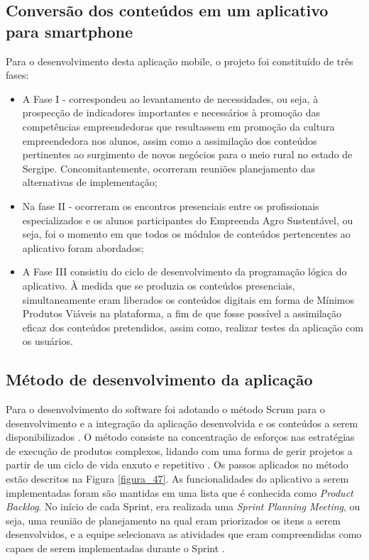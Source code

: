 \subsection{Conversão dos conteúdos em um aplicativo para smartphone}

Para o desenvolvimento desta aplicação mobile, o projeto foi constituído de três fases: 

\begin{itemize}
\item{A Fase I - correspondeu ao levantamento de necessidades, ou seja, à prospecção de indicadores importantes e necessários à promoção das competências empreendedoras que resultassem em promoção da cultura empreendedora nos alunos, assim como a assimilação dos conteúdos pertinentes ao surgimento de novos negócios para o meio rural no estado de Sergipe. Concomitantemente, ocorreram reuniões planejamento das alternativas de implementação;}
\item{Na fase II - ocorreram os encontros presenciais entre os profissionais especializados e os alunos participantes do Empreenda Agro Sustentável, ou seja, foi o momento em que todos os módulos de conteúdos pertencentes ao aplicativo foram abordados;}
\item{A Fase III consistiu do ciclo de desenvolvimento da programação lógica do aplicativo. À medida que se produzia os conteúdos presenciais, simultaneamente eram liberados os conteúdos digitais em forma de Mínimos Produtos Viáveis na plataforma, a fim de que fosse possível a assimilação eficaz dos conteúdos pretendidos, assim como, realizar testes da aplicação com os usuários.}
    
\end{itemize}

\subsection{Método de desenvolvimento da aplicação}

Para o desenvolvimento do software foi adotando o método Scrum para o desenvolvimento e a integração da aplicação desenvolvida e os conteúdos a serem disponibilizados \cite{schreier_solar_2017}. O método consiste na concentração de esforços nas estratégias de execução de produtos complexos, lidando com uma forma de gerir projetos a partir de um ciclo de vida enxuto e repetitivo \cite{bernardo_framework_2019}. Os passos aplicados no método estão descritos na Figura \ref{figura_47}. 
As funcionalidades do aplicativo a serem implementadas foram são mantidas em uma lista que é conhecida como \textit{Product Backlog}. No início de cada Sprint, era realizada uma \textit{Sprint Planning Meeting}, ou seja, uma reunião de planejamento na qual eram priorizados os itens a serem desenvolvidos, e a equipe selecionava as atividades que eram compreendidas como capaes de serem implementadas durante o Sprint \cite{trainning_education_services_curso_2018}.



